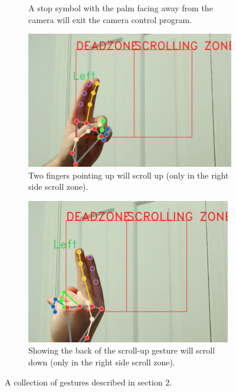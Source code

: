 \documentclass{article}
\begin{document}
\begin{figure}
\begin{subfigure}[T]{0.3\textwidth}
        \caption{A stop symbol with the palm facing away from the camera will exit the camera control program.}
    \end{subfigure}\hfill
    \begin{subfigure}[T]{0.3\textwidth}
        \centering
        \includegraphics[width=.8\linewidth]{two_up.png}
        \caption{Two fingers pointing up will scroll up (only in the right side scroll zone).}
    \end{subfigure}\hfill
    \begin{subfigure}[T]{0.3\textwidth}
        \centering
        \includegraphics[width=.8\linewidth]{two_up_inverted.png}
        \caption{Showing the back of the scroll-up gesture will scroll down (only in the right side scroll zone).}
    \end{subfigure}
    \caption{A collection of gestures described in section 2.}
    \label{fig:gestures}
\end{figure}

\end{document}
